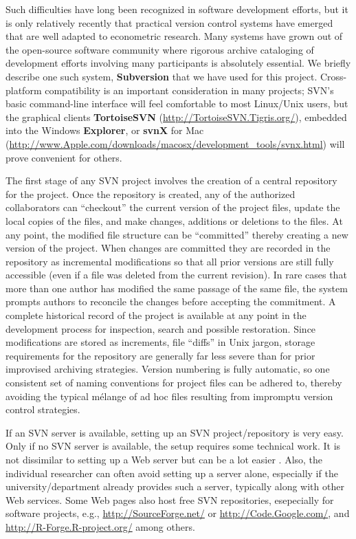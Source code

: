 \documentclass[10pt,a4paper,twoside]{article}
\let\pkg=\textbf
\begin{document}
Such difficulties have long been recognized in software development
efforts, but it is only relatively recently that practical version control systems
have emerged that are well adapted to econometric research.  Many
systems have grown out of the open-source software community where rigorous
archive cataloging of development efforts involving many participants is
absolutely essential.  We briefly describe one such system, \pkg{Subversion} 
\citep[SVN, \url{http://Subversion.Tigris.org/}, see][]{repro:Pilato+Collins-Sussman+Fitzpatrick:2004}
that we have used for this project.
Cross-platform compatibility is an important consideration in many projects;
SVN's basic command-line interface will feel comfortable to most 
Linux/Unix users, but the graphical clients \pkg{TortoiseSVN}
(\url{http://TortoiseSVN.Tigris.org/}), embedded 
into the Windows \pkg{Explorer}, or  \pkg{svnX} for 
Mac (\url{http://www.Apple.com/downloads/macosx/development_tools/svnx.html})
will prove convenient for others.

The first stage of any SVN project involves the creation of a central repository
for the project.  Once  the repository is created, any of the authorized collaborators
can ``checkout'' the current version of the project files, update the local copies
of the files, and make changes, additions or deletions to the files.  At any point,
the modified  file structure  can be ``committed'' thereby creating a new version
of the project.  When changes are committed they are recorded in the repository
as incremental modifications so that all prior versions are still fully accessible
(even if a file was deleted from the current revision).
In rare cases that more than one author has modified the same passage of the same
file, the system prompts authors to reconcile the changes before accepting the
commitment.  A complete historical record of the project is available at any point in 
the development process for inspection, search and possible restoration.
Since modifications are stored as increments, file ``diffs'' in Unix jargon,
storage requirements for the repository are generally far less severe than for
prior improvised archiving strategies.  Version numbering is fully automatic,
so one consistent set of naming conventions for project files can be adhered
to, thereby avoiding the typical m\'elange of ad hoc files resulting from impromptu
version control strategies.

If an SVN server is available, setting up an SVN project/repository is very easy.
Only if no SVN server is available, the setup requires some technical work.
It is not dissimilar to setting up a Web server but can be a lot easier
\citep[see][Chapter~6]{repro:Pilato+Collins-Sussman+Fitzpatrick:2004}. Also,
the individual researcher can often avoid setting up a server alone, especially if the university/department
already provides such a server, typically along with other Web services.
Some Web pages also host free SVN repositories, esepecially for software projects, e.g.,
\url{http://SourceForge.net/} or \url{http://Code.Google.com/},
and \url{http://R-Forge.R-project.org/} among others.
\end{document}
